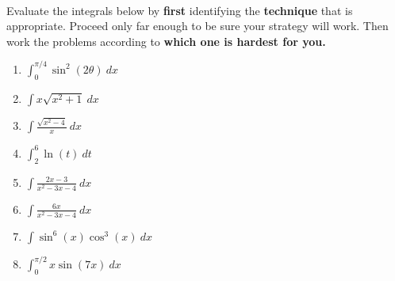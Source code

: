 \documentclass[11pt,fleqn]{article}
\begin{document}
\renewcommand{\headrulewidth}{0pt}
\newcommand{\blank}[1]{\rule{#1}{0.75pt}}
\newcommand{\bc}{\begin{center}}
\newcommand{\ec}{\end{center}}
\renewcommand{\d}{\displaystyle}

\vspace*{-0.7in}

\begin{center}
  \large
  \\
   
\end{center}
 Evaluate the integrals below by \textbf{first} identifying the \textbf{technique} that is appropriate. Proceed only far enough to be sure your strategy will work. Then work the problems according to \textbf{which one is hardest for you.}
\begin{enumerate}
\item $\displaystyle{\int_0^{\pi/4} \sin^2(2\theta)\: dx}$
\vfill
\item $\displaystyle{\int x \sqrt{x^2+1} \: dx}$
\vfill
\item $\displaystyle{\int \frac{\sqrt{x^2-4}}{x} \: dx}$
\vfill
\item $\displaystyle{\int_2^6  \ln (t)  \: dt}$
\vfill
\newpage
\item $\displaystyle{\int \frac{2x-3}{x^2-3x-4}  \: dx}$
\vfill
\item $\displaystyle{\int  \frac{6x}{x^2-3x-4}\: dx}$
\vfill

\item $\displaystyle{\int  \sin^6(x) \cos^3(x)\: dx}$
\vfill
\item $\displaystyle{\int_0^{\pi/2}  x\sin(7x) \: dx}$
\vfill
\end{enumerate}
\end{document}
